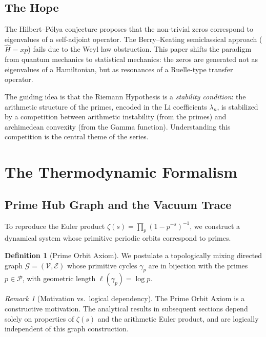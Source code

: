 \documentclass[12pt,a4paper]{article}
\theoremstyle{definition}
\newtheorem{definition}[theorem]{Definition}
\theoremstyle{remark}
\newtheorem{remark}[theorem]{Remark}
\newcommand{\PP}{\mathcal{P}}
\begin{document}
\subsection{The Hope}

The Hilbert--P\'olya conjecture proposes that the non-trivial zeros correspond to eigenvalues of a self-adjoint operator. The Berry--Keating semiclassical approach ($\hat{H} = xp$) fails due to the Weyl law obstruction. This paper shifts the paradigm from quantum mechanics to statistical mechanics: the zeros are generated not as eigenvalues of a Hamiltonian, but as resonances of a Ruelle-type transfer operator.

The guiding idea is that the Riemann Hypothesis is a \emph{stability condition}: the arithmetic structure of the primes, encoded in the Li coefficients $\lambda_n$, is stabilized by a competition between arithmetic instability (from the primes) and archimedean convexity (from the Gamma function). Understanding this competition is the central theme of the series.


\section{The Thermodynamic Formalism}
\label{sec:thermodynamic}

\subsection{Prime Hub Graph and the Vacuum Trace}

To reproduce the Euler product $\zeta(s) = \prod_p (1-p^{-s})^{-1}$, we construct a dynamical system whose primitive periodic orbits correspond to primes.

\begin{definition}[Prime Orbit Axiom]
We postulate a topologically mixing directed graph $\mathcal{G} = (\mathcal{V}, \mathcal{E})$ whose primitive cycles $\gamma_p$ are in bijection with the primes $p \in \PP$, with geometric length $\ell(\gamma_p) = \log p$.
\end{definition}

\begin{remark}[Motivation vs.\ logical dependency]
The Prime Orbit Axiom is a constructive motivation. The analytical results in subsequent sections depend solely on properties of $\zeta(s)$ and the arithmetic Euler product, and are logically independent of this graph construction.
\end{remark}
\end{document}
